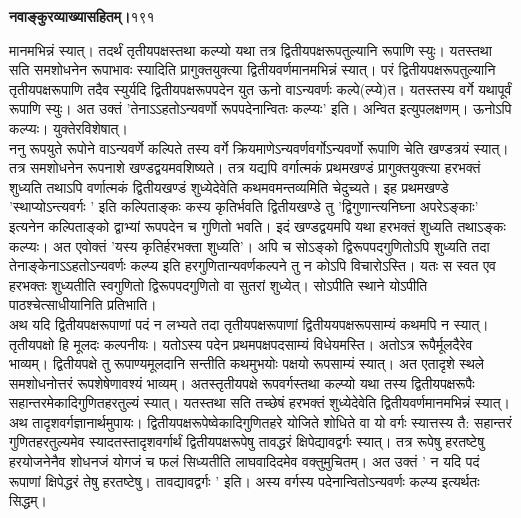\documentclass[11pt, openany]{book}
\begin{document}
\onehalfspacing
\hspace{2in}\textbf{नवाङ्कुरव्याख्यासहितम्।}\hspace{2in}१९१

\vspace{5mm}

\begin{sloppypar}
\hangindent=0.2in मानमभिन्नं स्यात्। तदर्थं तृतीयपक्षस्तथा कल्प्यो यथा तत्र द्वितीयपक्षरूपतुल्यानि रूपाणि स्युः। यतस्तथा सति समशोधनेन रूपाभावः स्यादिति प्रागुक्तयुक्त्या द्वितीयवर्णमानमभिन्नं स्यात्। परं द्वितीयपक्षरूपतुल्यानि तृतीयपक्षरूपाणि तदैव स्युर्यदि द्वितीयपक्षरूपपदेन युत ऊनो वाऽन्यवर्णः कल्पे(ल्प्ये)त। यतस्तस्य वर्गे यथापूर्वं रूपाणि स्युः। अत उक्तं 'तेनाऽऽहतोऽन्यवर्णो रूपपदेनान्वितः कल्प्यः' इति। अन्वित इत्युपलक्षणम्। ऊनोऽपि कल्प्यः। युक्तेरविशेषात्।\\

\hangindent=0.2in \hspace{0.2in}ननु रूपयुते रूपोने वाऽन्यवर्णे कल्पिते तस्य वर्गे क्रियमाणेऽन्यवर्णवर्गोऽन्यवर्णो रूपाणि चेति खण्डत्रयं स्यात्। तत्र समशोधनेन रूपनाशे खण्डद्वयमवशिष्यते। तत्र यद्यपि वर्गात्मकं प्रथमखण्डं प्रागुक्तयुक्त्या हरभक्तं शुध्यति तथाऽपि वर्णात्मकं द्वितीयखण्डं शुध्येदेवेति कथमवमन्तव्यमिति चेदुच्यते। इह प्रथमखण्डे 'स्थाप्योऽन्त्यवर्गः ' इति कल्पिताङ्कः कस्य कृतिर्भवति द्वितीयखण्डे तु 'द्विगुणान्त्यनिघ्ना अपरेऽङ्काः' इत्यनेन कल्पिताङ्को द्वाभ्यां रूपपदेन च गुणितो भवति। इदं खण्डद्वयमपि यथा हरभक्तं शुध्यति तथाऽङ्कः कल्प्यः। अत एवोक्तं 'यस्य कृतिर्हरभक्ता शुध्यति'। अपि च सोऽङ्को द्विरूपपदगुणितोऽपि शुध्यति तदा तेनाङ्केनाऽऽहतोऽन्यवर्णः कल्प्य इति हरगुणितान्यवर्णकल्पने तु न कोऽपि विचारोऽस्ति। यतः स स्वत एव हरभक्तः शुध्यतीति स्वगुणितो द्विरूपपदगुणितो वा सुतरां शुध्येत्। सोऽपीति स्थाने योऽपीति पाठश्चेत्साधीयानिति प्रतिभाति।\\

\hangindent=0.2in \hspace{0.2in}अथ यदि द्वितीयपक्षरूपाणां पदं न लभ्यते तदा तृतीयपक्षरूपाणां द्वितीययपक्षरूपसाम्यं कथमपि न स्यात्। तृतीयपक्षो हि मूलदः कल्पनीयः। यतोऽस्य पदेन प्रथमपक्षपदसाम्यं विधेयमस्ति। अतोऽत्र रूपैर्मूलदैरेव भाव्यम्। द्वितीयपक्षे तु रूपाण्यमूलदानि सन्तीति कथमुभयोः पक्षयो रूपसाम्यं स्यात्। अत एतादृशे स्थले समशोधनोत्तरं रूपशेषेणावश्यं भाव्यम्। अतस्तृतीयपक्षे रूपवर्गस्तथा कल्प्यो यथा तस्य द्वितीयपक्षरूपैः सहान्तरमेकादिगुणितहरतुल्यं स्यात्। यतस्तथा सति तच्छेषं हरभक्तं शुध्येदेवेति द्वितीयवर्णमानमभिन्नं स्यात्।\\

\hangindent=0.2in \hspace{0.2in}अथ तादृशवर्गज्ञानार्थमुपायः। द्वितीयपक्षरूपेष्वेकादिगुणितहरे योजिते शोधिते वा यो वर्गः स्यात्तस्य तै: सहान्तरं गुणितहरतुल्यमेव स्यादतस्तादृशवर्गार्थं द्वितीयपक्षरूपेषु तावद्धरं क्षिपेद्यावद्वर्गः स्यात्। तत्र रूपेषु हरतष्टेषु हरयोजनेनैव शोधनजं योगजं च फलं सिध्यतीति लाघवादिदमेव वक्तुमुचितम्। अत उक्तं ' न यदि पदं रूपाणां क्षिपेद्धरं तेषु हरतष्टेषु। तावद्यावद्वर्गः ' इति। अस्य वर्गस्य पदेनान्वितोऽन्यवर्णः कल्प्य इत्यर्थतः सिद्धम्।
\end{sloppypar}
\thispagestyle{empty}
\newpage
\end{document}
